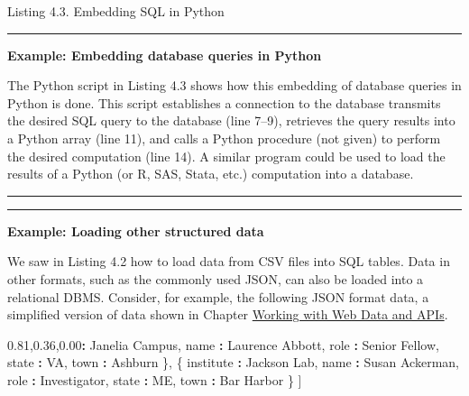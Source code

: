\documentclass[]{krantz}
\newenvironment{Shaded}{\begin{snugshade}}{\end{snugshade}}
\newcommand{\StringTok}[1]{\textcolor[rgb]{0.31,0.60,0.02}{#1}}
\newcommand{\OperatorTok}[1]{\textcolor[rgb]{0.81,0.36,0.00}{\textbf{#1}}}
\newcommand{\NormalTok}[1]{#1}
\begin{document}
Listing 4.3. Embedding SQL in Python

\begin{center}\rule{0.5\linewidth}{\linethickness}\end{center}

\textbf{Example: Embedding database queries in Python}

The Python script in Listing 4.3 shows how this embedding of database
queries in Python is done. This script establishes a connection to the
database transmits the desired SQL query to the database (line 7--9),
retrieves the query results into a Python array (line 11), and calls a
Python procedure (not given) to perform the desired computation (line
14). A similar program could be used to load the results of a Python (or
R, SAS, Stata, etc.) computation into a database.

\begin{center}\rule{0.5\linewidth}{\linethickness}\end{center}

\begin{center}\rule{0.5\linewidth}{\linethickness}\end{center}

\textbf{Example: Loading other structured data}

We saw in Listing 4.2 how to load data from CSV files into SQL tables.
Data in other formats, such as the commonly used JSON, can also be
loaded into a relational DBMS. Consider, for example, the following JSON
format data, a simplified version of data shown in Chapter
\protect\hyperlink{chap:web}{Working with Web Data and APIs}.

\pagebreak

\begin{Shaded}
\begin{Highlighting}[]
\NormalTok{[}
\NormalTok{  \{}
\NormalTok{    institute }\OperatorTok{:}\StringTok{ }\NormalTok{Janelia Campus,}
\NormalTok{    name }\OperatorTok{:}\StringTok{ }\NormalTok{Laurence Abbott,}
\NormalTok{    role }\OperatorTok{:}\StringTok{ }\NormalTok{Senior Fellow,}
\NormalTok{    state }\OperatorTok{:}\StringTok{ }\NormalTok{VA,}
\NormalTok{    town }\OperatorTok{:}\StringTok{ }\NormalTok{Ashburn}
\NormalTok{  \},}
\NormalTok{  \{}
\NormalTok{    institute }\OperatorTok{:}\StringTok{ }\NormalTok{Jackson Lab,}
\NormalTok{    name }\OperatorTok{:}\StringTok{ }\NormalTok{Susan Ackerman,}
\NormalTok{    role }\OperatorTok{:}\StringTok{ }\NormalTok{Investigator,}
\NormalTok{    state }\OperatorTok{:}\StringTok{ }\NormalTok{ME,}
\NormalTok{    town }\OperatorTok{:}\StringTok{ }\NormalTok{Bar Harbor}
\NormalTok{  \}}
\NormalTok{]}
\end{Highlighting}
\end{Shaded}
\end{document}
